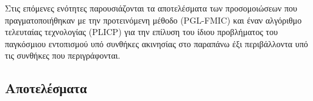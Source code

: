 Στις επόμενες ενότητες παρουσιάζονται τα αποτελέσματα των προσομοιώσεων που πραγματοποιήθηκαν με
την προτεινόμενη μέθοδο (PGL-FMIC) και έναν αλγόριθμο τελευταίας τεχνολογίας (PLICP) για
την επίλυση του ίδιου προβλήματος του παγκόσμιου εντοπισμού υπό συνθήκες ακινησίας στο
παραπάνω έξι περιβάλλοντα υπό τις συνθήκες που περιγράφονται.






\subsection{Αποτελέσματα}
\label{subsection:02_03_04:02}

\begin{figure}
  \hspace{-1.5cm}
  
\caption{}
\label{}
\end{figure}

\begin{figure}
  \hspace{-1cm}
  \begin{subfigure}{0.5\linewidth}
    
    \caption{}
    \label{}
  \end{subfigure}\hspace{1.0cm}
  \begin{subfigure}{0.5\linewidth}
    
    \caption{}
    \label{}
    \end{subfigure}
\caption{}
\label{}
\end{figure}

\begin{figure}
  \hspace{1cm}
  \begin{subfigure}{0.5\linewidth}
    
    \caption{}
    \label{}
  \end{subfigure}%
  \begin{subfigure}{0.5\linewidth}
    
    \caption{}
    \label{}
    \end{subfigure}
\caption{}
\label{}
\end{figure}

